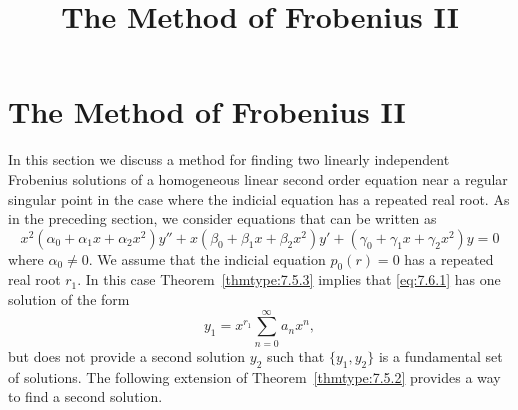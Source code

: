 \documentclass{ximera}
\title{The Method of Frobenius II}%
\begin{document}
\begin{abstract}

\end{abstract}

\maketitle

\section*{The Method of Frobenius II}

In this section we discuss a method for finding two linearly
independent Frobenius solutions of a homogeneous linear second order
equation near a regular singular point in the case where the indicial
equation has a repeated real root. As in the preceding section, we
consider equations that can be written as
\begin{equation} \label{eq:7.6.1}
x^2(\alpha_0+\alpha_1x+\alpha_2x^2)y''+x(\beta_0+\beta_1x+\beta_2x^2)y'
+(\gamma_0+\gamma_1x+\gamma_2x^2)y=0
\end{equation}
where $\alpha_0\ne0$. We assume that the indicial equation $p_0(r)=0$
has a repeated real root $r_1$. In this case Theorem~\ref{thmtype:7.5.3}
implies that \eqref{eq:7.6.1} has one solution of the form
$$
y_1=x^{r_1}\sum_{n=0}^\infty a_nx^n,
$$
but does not provide a second solution $y_2$ such that $\{y_1,y_2\}$
is a fundamental set of solutions. The following extension of
Theorem~\ref{thmtype:7.5.2} provides a way to find a second solution.
\end{document}
